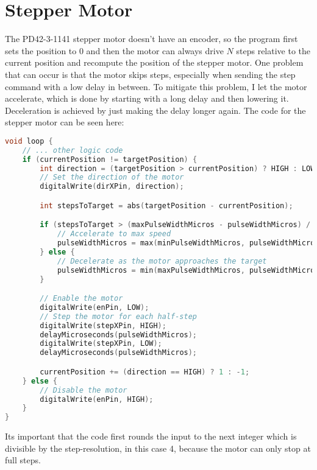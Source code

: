\section{Stepper Motor}\label{sec:stepper-motor}
The PD42-3-1141 stepper motor doesn't have an encoder, so the program first sets the position to $0$ and then the motor can always drive $N$ steps relative to the current position and recompute the position of the stepper motor.
One problem that can occur is that the motor skips steps, especially when sending the step command with a low delay in between.
To mitigate this problem, I let the motor accelerate, which is done by starting with a long delay and then lowering it.
Deceleration is achieved by just making the delay longer again.
The code for the stepper motor can be seen here:
\begin{lstlisting}[language=cpp,breaklines,label={lst:stepper-motor}]
void loop {
    // ... other logic code
    if (currentPosition != targetPosition) {
        int direction = (targetPosition > currentPosition) ? HIGH : LOW;
        // Set the direction of the motor
        digitalWrite(dirXPin, direction);

        int stepsToTarget = abs(targetPosition - currentPosition);

        if (stepsToTarget > (maxPulseWidthMicros - pulseWidthMicros) / acc) {
            // Accelerate to max speed
            pulseWidthMicros = max(minPulseWidthMicros, pulseWidthMicros - acc);
        } else {
            // Decelerate as the motor approaches the target
            pulseWidthMicros = min(maxPulseWidthMicros, pulseWidthMicros + acc);
        }

        // Enable the motor
        digitalWrite(enPin, LOW);
        // Step the motor for each half-step
        digitalWrite(stepXPin, HIGH);
        delayMicroseconds(pulseWidthMicros);
        digitalWrite(stepXPin, LOW);
        delayMicroseconds(pulseWidthMicros);

        currentPosition += (direction == HIGH) ? 1 : -1;
    } else {
        // Disable the motor
        digitalWrite(enPin, HIGH);
    }
}
\end{lstlisting}
Its important that the code first rounds the input to the next integer which is divisible by the step-resolution, in this case 4, because the motor can only stop at full steps.\\
\vspace{0.5cm}\\
